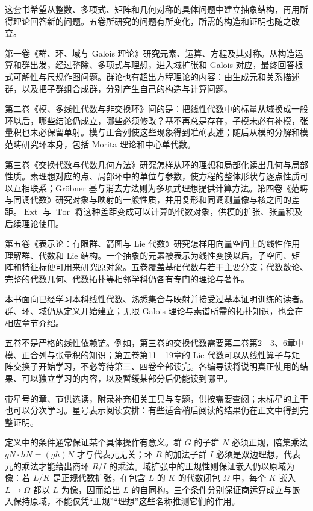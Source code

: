 \ProseParagraphBreak
这套书希望从整数、多项式、矩阵和几何对称的具体问题中建立抽象结构，再用所得理论回答新的问题。五卷所研究的问题有所变化，所需的构造和证明也随之改变。

\ProseParagraphBreak
第一卷《群、环、域与 Galois 理论》研究元素、运算、方程及其对称。从构造运算和群出发，经过整除、多项式与理想，进入域扩张和 Galois 对应，最终回答根式可解性与尺规作图问题。群论也有超出方程理论的内容：由生成元和关系描述群，以及把子群组合成群，分别产生自己的构造与计算问题。

\ProseParagraphBreak
第二卷《模、多线性代数与非交换环》问的是：把线性代数中的标量从域换成一般环以后，哪些结论仍成立，哪些必须修改？基不再总是存在，子模未必有补模，张量积也未必保留单射。模与正合列使这些现象得到准确表述；随后从模的分解和模范畴研究环本身，包括 Morita 理论和中心单代数。

\ProseParagraphBreak
第三卷《交换代数与代数几何方法》研究怎样从环的理想和局部化读出几何与局部性质。素理想对应的点、局部环中的单位与参数，使方程的整体形状与逐点性质可以互相联系；Gröbner 基与消去方法则为多项式理想提供计算方法。第四卷《范畴与同调代数》研究对象与映射的一般性质，并用复形和同调测量像与核之间的差距。\(\operatorname{Ext}\) 与 \(\operatorname{Tor}\) 将这种差距变成可以计算的代数对象，供模的扩张、张量积及后续理论使用。

\ProseParagraphBreak
第五卷《表示论：有限群、箭图与 Lie 代数》研究怎样用向量空间上的线性作用理解群、代数和 Lie 结构。一个抽象的元素被表示为线性变换以后，子空间、矩阵和特征标便可用来研究原对象。五卷覆盖基础代数与若干主要分支；代数数论、完整的代数几何、代数拓扑等相邻学科仍各有专门的理论与著作。

\ProseParagraphBreak
本书面向已经学习本科线性代数、熟悉集合与映射并接受过基本证明训练的读者。群、环、域仍从定义开始建立；无限 Galois 理论与素谱所需的拓扑知识，也会在相应章节介绍。

\ProseParagraphBreak
五卷不是严格的线性依赖链。例如，第三卷的交换代数需要第二卷第2—3、6章中模、正合列与张量积的知识；第五卷第11—19章的 Lie 代数可以从线性算子与矩阵交换子开始学习，不必等待第三、四卷全部读完。各编导读将说明真正使用的结果、可以独立学习的内容，以及暂缓某部分后仍能读到哪里。

\ProseParagraphBreak
带星号的章、节供选读，附录补充相关工具与专题，供按需要查阅；未标星的主干也可以分次学习。星号表示阅读安排：有些适合稍后阅读的结果仍在正文中得到完整证明。

\ProseParagraphBreak
定义中的条件通常保证某个具体操作有意义。群 \(G\) 的子群 \(N\) 必须正规，陪集乘法 \(gN\cdot hN=(gh)N\) 才与代表元无关；环 \(R\) 的加法子群 \(I\) 必须是双边理想，代表元的乘法才能给出商环 \(R/I\) 的乘法。域扩张中的正规性则保证嵌入仍以原域为像：若 \(L/K\) 是正规代数扩张，在包含 \(L\) 的 \(K\) 的代数闭包 \(\Omega\) 中，每个 \(K\) 嵌入 \(L\rightarrow\Omega\) 都以 \(L\) 为像，因而给出 \(L\) 的自同构。三个条件分别保证商运算成立与嵌入保持原域，不能仅凭“正规”“理想”这些名称推测它们的作用。

